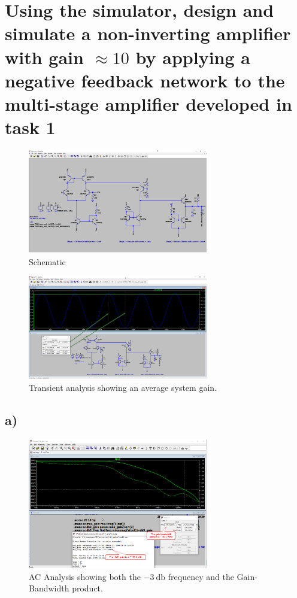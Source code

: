 \documentclass{article}
\begin{document}
	\section{Using the simulator, design and simulate a non-inverting amplifier with gain $\approx 10$ by applying a negative feedback network to the multi-stage amplifier developed in task 1}
	
	\begin{figure}[H]
	    \centering
	    \includegraphics[width=0.7\textwidth]{t2-sch}
	    \caption{Schematic}
	\end{figure}
	
	\begin{figure}[H]
	    \centering
	    \includegraphics[width=0.7\textwidth]{t2-trans}
	    \caption{Transient analysis showing an average system gain.}
	\end{figure}
	
	\subsection*{a)}
	
	\begin{figure}[H]
	    \centering
	    \includegraphics[width=0.7\textwidth]{t1-ac}
	    \caption{AC Analysis showing both the $\SI{-3}{\decibel}$ frequency and the Gain-Bandwidth product.}
	\end{figure}
	
\end{document}
